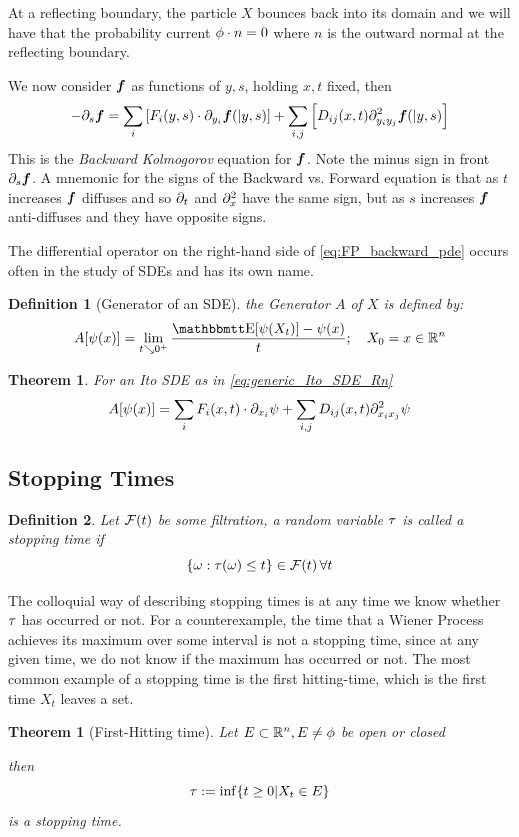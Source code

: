 \documentclass{article}
\newtheorem{thm}{Theorem}[section]
\newtheorem{lemma}{Theorem}[thm]
\newtheorem{defn}{Definition}[thm]
\begin{document}
At a reflecting boundary, the particle $X$ bounces back into its domain and we
will have that the probability current ${ \phi }\cdot n = 0$ where $n$ is the outward
normal at the reflecting boundary.

We now consider ${ \boldsymbol{f} }$ as functions of $y,s$, holding $x,t$ fixed, then
\begin{equation}
-{\partial}_s { \boldsymbol{f} }= \sum_i  \left[F_i(y,s) \cdot {\partial}_{y_i}{ \boldsymbol{f} }(|y,s) \right] 
+ 
\sum_{i,j}   \left[ D_{ij}(x,t) {\partial}^2_{y_i y_j}{ \boldsymbol{f} }(|y,s) \right]
\label{eq:FP_backward_pde}
\end{equation} 
This is the \emph{Backward Kolmogorov} equation for ${ \boldsymbol{f} }$. Note the minus sign
in front ${\partial}_s { \boldsymbol{f} }$. A mnemonic for the signs of the Backward vs. Forward
equation is that as $t$ increases ${ \boldsymbol{f} }$ diffuses and so ${\partial}_t$ and ${\partial}^2_{x}$
have the same sign, but as $s$ increases ${ \boldsymbol{f} }$ anti-diffuses and they have
opposite signs. 
  
The differential operator on the right-hand side of
\cref{eq:FP_backward_pde} occurs often in the study of SDEs and has its own
name.
\begin{defn}[Generator of an SDE] the Generator $A$ of $X$ is defined by:
$$
A[\psi(x)] = \lim_{t \searrow 0^+} \frac{\Exp[\psi(X_t)]  - \psi(x)}{t} ;  \quad X_0 =
x \in \R^n
$$
\end{defn} 
\begin{lemma} For an Ito SDE as in \cref{eq:generic_Ito_SDE_Rn} 
$$
A[\psi(x)] = \sum_i F_i(x,t) \cdot {\partial}_{x_i} \psi + \sum_{i,j} D_{ij}(x,t)
{\partial}^2_{x_i x_j}\psi $$
\end{lemma}


\subsection{Stopping Times}
\begin{defn}
Let ${\mathcal{F}}(t)$ be some filtration, a random variable ${\tau}$ is called a
\emph{stopping time} if 
$$
\{{\omega} : {\tau}({\omega}) \leq t\} \in {\mathcal{F}}(t) \, \forall t  
$$
\end{defn}
The colloquial way of describing stopping times is at any time we know
whether ${\tau}$ has occurred or not. For a counterexample, the time that a Wiener
Process achieves its maximum over some interval is not a stopping time, since at any
given time, we do not know if the maximum has occurred or not. The most common
example of a stopping time is the first hitting-time, which is the first time
$X_t$ leaves a set. 
\begin{thm}[First-Hitting time] Let $E \subset { \mathbb{R} }^n, E \neq
\phi$ be open or closed
 
then $${\tau} := \inf\{ t \geq 0 | X_t \in E\}$$ is a stopping time.
\end{thm}
 
\end{document}

